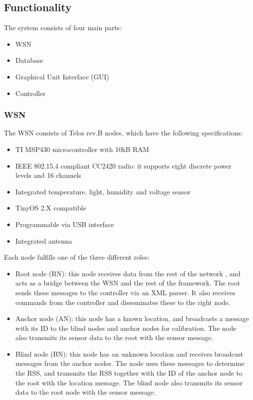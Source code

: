 \subsection{Functionality}
The system consists of four main parts:
\begin{itemize}
	\item WSN
	\item Database
	\item Graphical Unit Interface (GUI)
	\item Controller
\end{itemize}

\subsubsection{WSN}
The WSN consists of Telos rev.B nodes, which have the following specifications: 
\begin{itemize}
	\item TI MSP430 microcontroller with 10kB RAM 
	\item IEEE 802.15.4 compliant CC2420 radio: it supports eight discrete power levels and 16 channels
	\item Integrated temperature, light, humidity and voltage sensor 
	\item TinyOS 2.X compatible 
	\item Programmable via USB interface 
	\item Integrated antenna 
\end{itemize}

Each node fulfills one of the three different roles: 
\begin{itemize}
	\item Root node (RN): this node receives data from the rest of the network , and acts as a bridge between the WSN and the rest of the framework. The root sends these messages to the controller via an XML parser. It also receives commands from the controller and disseminates these to the right node.
	\item Anchor node (AN): this node has a known location, and broadcasts a message with its ID to the blind nodes and anchor nodes for calibration. The node also transmits its sensor data to the root with the sensor message. 
	\item Blind node (BN): this node has an unknown location and receives broadcast messages from the anchor nodes. The node uses these messages to determine the RSS, and transmits the RSS together with the ID of the anchor node to the root with the location message. The blind node also transmits its sensor data to the root node with the sensor message. 
\end{itemize}

